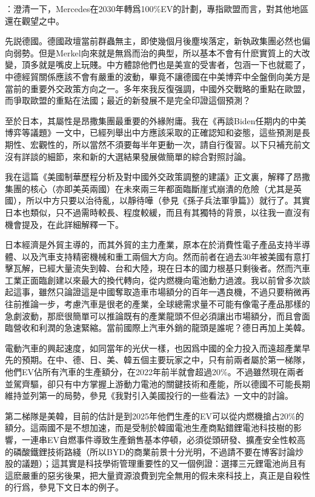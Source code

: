 \documentclass[twocolumn]{ctexart}
\begin{document}
：澄清一下，Mercedes在2030年轉爲100\%EV的計劃，專指歐盟而言，對其他地區還在觀望之中。


先説德國。德國政壇當前群蟲無主，即使幾個月後塵埃落定，新執政集團必然也偏向弱勢。但是Merkel向來就是無爲而治的典型，所以基本不會有什麽實質上的大改變，頂多就是嘴皮上玩賤。中方體諒他們也是美宣的受害者，包涵一下也就罷了，中德經貿關係應該不會有嚴重的波動，畢竟不讓德國在中美博弈中全盤倒向美方是當前的重要外交政策方向之一。多年來我反復强調，中國外交戰略的重點在歐盟，而爭取歐盟的重點在法國；最近的新發展不是完全印證這個預測？

至於日本，其屬性是昂撒集團最重要的外緣附庸。我在《再談Biden任期内的中美博弈等議題》一文中，已經列舉出中方應該采取的正確認知和姿態，這些預測是長期性、宏觀性的，所以當然不須要每半年更動一次，請自行復習。以下只補充前文沒有詳談的細節，來和新的大選結果發展做簡單的綜合對照討論。

我在這篇《美國制華歷程分析及對中國外交政策調整的建議》正文裏，解釋了昂撒集團的核心（亦即美英兩國）在未來兩三年都面臨斷崖式崩潰的危險（尤其是英國），所以中方只要以治待亂，以靜待嘩（參見《孫子兵法軍爭篇》）就行了。其實日本也類似，只不過需時較長、程度較緩，而且有其獨特的背景，以往我一直沒有機會提及，在此詳細解釋一下。

日本經濟是外貿主導的，而其外貿的主力產業，原本在於消費性電子產品支持半導體、以及汽車支持精密機械和重工兩個大方向。然而前者在過去30年被美國有意打擊瓦解，已經大量流失到韓、台和大陸，現在日本的國力根基只剩後者。然而汽車工業正面臨創建以來最大的換代轉向，從内燃機向電池動力過渡。我以前曾多次談起這事，雖然只論證這是中國奪取造車市場額分的百年一遇良機，不過只要稍微再往前推論一步，考慮汽車是很老的產業，全球總需求量不可能有像電子產品那樣的急劇波動，那麽很簡單可以推論既有的產業龍頭不但必須讓出市場額分，而且會面臨營收和利潤的急速緊縮。當前國際上汽車外銷的龍頭是誰呢？德日再加上美韓。

電動汽車的興起速度，如同當年的光伏一樣，也因爲中國的全力投入而遠超產業早先的預期。在中、德、日、美、韓五個主要玩家之中，只有前兩者屬於第一梯隊，他們EV佔所有汽車的生產額分，在2022年前半就會超過20\%。不過雖然現在兩者並駕齊驅，卻只有中方掌握上游動力電池的關鍵技術和產能，所以德國不可能長期維持並列第一的局勢，參見《我對引入美國投行的一些看法》一文中的討論。

第二梯隊是美韓，目前的估計是到2025年他們生產的EV可以從内燃機搶占20\%的額分。這兩國不是不想加速，而是受制於韓國電池生產商點錯鋰電池科技樹的影響，一連串EV自燃事件導致生產銷售基本停頓，必須從頭研發、擴產安全性較高的磷酸鐵鋰技術路綫（所以BYD的商業前景十分光明，不過請不要在博客討論炒股的議題）；這其實是科技學術管理重要性的又一個例證：選擇三元鋰電池尚且有這麽嚴重的惡劣後果，把大量資源浪費到完全無用的假未來科技上，真正是自殺性的行爲，參見下文日本的例子。
\end{document}
